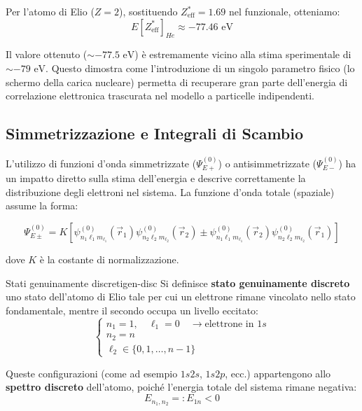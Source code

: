 Per l'atomo di Elio (\(Z=2\)), sostituendo \(Z_{\text{eff}}^* = 1.69\) nel funzionale, otteniamo:
\begin{equation}
    E[Z_{\text{eff}}^*]_{He} \approx -77.46 \text{ eV}
\end{equation}

Il valore ottenuto (\(\sim -77.5 \text{ eV}\)) è estremamente vicino alla stima sperimentale di \(\sim -79 \text{ eV}\). 
Questo dimostra come l'introduzione di un singolo parametro fisico (lo schermo della carica nucleare) permetta di recuperare gran parte dell'energia di correlazione elettronica trascurata nel modello a particelle indipendenti.

\subsection{Simmetrizzazione e Integrali di Scambio}
\label{sec: integrali_scambio}

L'utilizzo di funzioni d'onda simmetrizzate (\(\Psi_{E+}^{(0)}\)) o antisimmetrizzate (\(\Psi_{E-}^{(0)}\)) ha un impatto diretto sulla stima dell'energia e descrive correttamente la distribuzione degli elettroni nel sistema. La funzione d'onda totale (spaziale) assume la forma:

\begin{equation}
    \Psi_{E\pm}^{(0)} = K \left[ \psi_{n_1 \ell_1 m_{\ell_1}}^{(0)}(\vec{r}_1) \psi_{n_2 \ell_2 m_{\ell_2}}^{(0)}(\vec{r}_2) \pm \psi_{n_1 \ell_1 m_{\ell_1}}^{(0)}(\vec{r}_2) \psi_{n_2 \ell_2 m_{\ell_2}}^{(0)}(\vec{r}_1) \right]
\end{equation}

dove \(K\) è la costante di normalizzazione. 

\begin{note}{Stati genuinamente discreti}{gen-disc}
Si definisce \textbf{stato genuinamente discreto} uno stato dell'atomo di Elio tale per cui un elettrone rimane vincolato nello stato fondamentale, mentre il secondo occupa un livello eccitato:
\begin{equation}
    \begin{cases}
        n_1 = 1, \quad \ell_1 = 0 \quad \longrightarrow \text{elettrone in } 1s \\
        n_2 = n \\
        \ell_2 \in \{0, 1, \dots, n-1\}
    \end{cases}
\end{equation}

Queste configurazioni (come ad esempio \(1s 2s\), \(1s 2p\), ecc.) appartengono allo \textbf{spettro discreto} dell'atomo, poiché l'energia totale del sistema rimane negativa:
\begin{equation}
    E_{n_1, n_2} =: E_{1n} < 0
\end{equation}   
\end{note}

